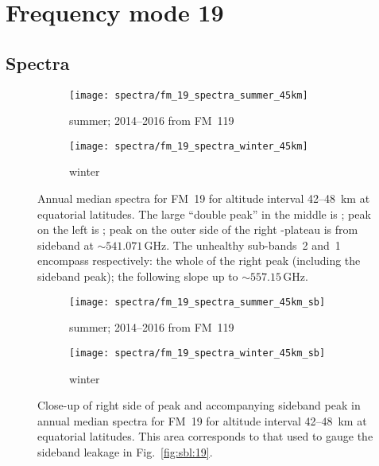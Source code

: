 \section{Frequency mode 19}
\label{FM19}
\subsection{Spectra}
\label{FM19:spectra}

\begin{figure}[ht]
    \centering
    \begin{subfigure}[b]{0.9545\textwidth}
        \texttt{[image: spectra/fm\_19\_spectra\_summer\_45km]}
        \caption{summer; 2014--2016 from FM~119}\label{fig:spectra:19:summer}
    \end{subfigure}
    \begin{subfigure}[b]{0.9545\textwidth}
        \texttt{[image: spectra/fm\_19\_spectra\_winter\_45km]}
        \caption{winter}\label{fig:spectra:19:winter}
    \end{subfigure}
    \caption{Annual median spectra for FM~19 for altitude interval 42--48~km
        at equatorial latitudes.  The large ``double peak'' in the middle is
        ; peak on the left is ; peak on the outer side of
        the right -plateau is  from sideband at
        $\sim541.071\,\mathrm{GHz}$.  The unhealthy sub-bands~2 and~1 encompass
        respectively: the whole of the right  peak (including the
        sideband peak); the following slope up to $\sim557.15\,\mathrm{GHz}$.
        }\label{fig:spectra:19}
\end{figure}

\begin{figure}[ht]
    \centering
    \begin{subfigure}[b]{0.9545\textwidth}
        \texttt{[image: spectra/fm\_19\_spectra\_summer\_45km\_sb]}
        \caption{summer; 2014--2016 from FM~119
            }\label{fig:spectra:19:summer:closeup}
    \end{subfigure}
    \begin{subfigure}[b]{0.9545\textwidth}
        \texttt{[image: spectra/fm\_19\_spectra\_winter\_45km\_sb]}
        \caption{winter}\label{fig:spectra:19:winter:closeup}
    \end{subfigure}
    \caption{Close-up of right side of  peak and accompanying
        sideband  peak in annual median spectra for FM~19
        for altitude interval 42--48~km at equatorial latitudes.  This area
        corresponds to that used to gauge the sideband leakage in
        Fig.~\ref{fig:sbl:19}.
        }\label{fig:spectra:19:closeup}
\end{figure}

